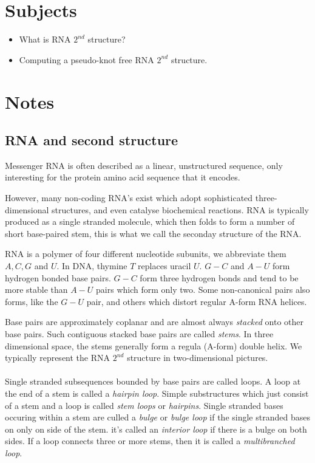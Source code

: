 


    \section{Subjects}
    \begin{itemize}
        \item What is RNA $2^{nd}$ structure?
        \item Computing a pseudo-knot free RNA $2^{nd}$ structure.
    \end{itemize}
    
    \section{Notes}
    
    \subsection{RNA and second structure}
    Messenger RNA is often described as a linear, unstructured sequence, only 
    interesting for the protein amino acid sequence that it encodes.
    
    However, many non-coding RNA's exist which adopt sophisticated 
    three-dimensional structures, and even catalyse biochemical reactions.  RNA 
    is typically produced as a single stranded molecule, which then folds to 
    form a number of short base-paired stem, this is what we call the seconday 
    structure of the RNA. 
    
    RNA is a polymer of four different nucleotide subunits, we abbreviate them 
    $A,C,G$ and $U$. In DNA, thymine $T$ replaces uracil $U$. $G-C$ and $A-U$ 
    form hydrogen bonded base pairs. $G-C$ form three hydrogen bonds and tend 
    to be more stable than $A-U$ pairs which form only two. Some non-canonical 
    pairs also forms, like the $G-U$ pair, and others which distort regular 
    A-form RNA helices.
    
    Base pairs are approximately coplanar and are almost always 
    \textit{stacked} onto other base pairs. Such contiguous stacked base pairs 
    are called \textit{stems}. In three dimensional space, the stems generally 
    form a regula (A-form) double helix. We typically represent the RNA 
    $2^{nd}$ structure in two-dimensional pictures.
    \\
    \\
    Single stranded subsequences bounded by base pairs are called loops. A loop 
    at the end of a stem is called a \textit{hairpin loop}. Simple 
    substructures which just consist of a stem and a loop is called 
    \textit{stem loops} or \textit{hairpins}. Single stranded bases occuring 
    within a stem are culled a \textit{bulge} or \textit{bulge loop} if the 
    single stranded bases on only on side of the stem. it's called an 
    \textit{interior loop} if there is a bulge on both sides. If a loop 
    connects three or more stems, then it is called a \textit{multibranched 
    loop}.

